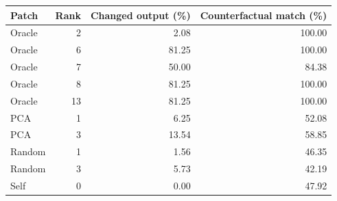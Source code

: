 \begin{center}\small
\begin{tabular}{@{}lrrr@{}}
\toprule
Patch & Rank & Changed output (\%) & Counterfactual match (\%) \\
\midrule
Oracle & 2 & 2.08 & 100.00 \\
Oracle & 6 & 81.25 & 100.00 \\
Oracle & 7 & 50.00 & 84.38 \\
Oracle & 8 & 81.25 & 100.00 \\
Oracle & 13 & 81.25 & 100.00 \\
PCA & 1 & 6.25 & 52.08 \\
PCA & 3 & 13.54 & 58.85 \\
Random & 1 & 1.56 & 46.35 \\
Random & 3 & 5.73 & 42.19 \\
Self & 0 & 0.00 & 47.92 \\
\bottomrule
\end{tabular}
\end{center}
